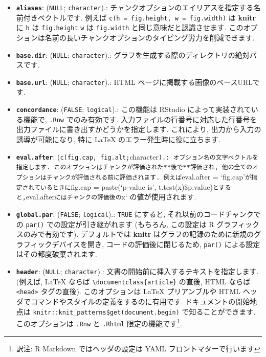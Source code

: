 \documentclass[
  11pt,
]{bxjsreport}
\providecommand{\tightlist}{%
  \setlength{\itemsep}{0pt}\setlength{\parskip}{0pt}}
\begin{document}
\begin{itemize}
\tightlist
\item
  \textbf{\texttt{aliases}}: (\texttt{NULL}; \texttt{character}).: チャンクオプションのエイリアスを指定する名前付きベクトルです. 例えば \texttt{c(h = \textquotesingle{}fig.height\textquotesingle{},\ w\ =\ \textquotesingle{}fig.width\textquotesingle{})} は \textbf{knitr} に \texttt{h} は \texttt{fig.height} \texttt{w} は \texttt{fig.width} と同じ意味だと認識させます. このオプションは名前の長いチャンクオプションのタイピング労力を削減できます.
\item
  \textbf{\texttt{base.dir}}: (\texttt{NULL}; \texttt{character}).: グラフを生成する際のディレクトリの絶対パスです.
\item
  \textbf{\texttt{base.url}}: (\texttt{NULL}; \texttt{character}).: HTML ページに掲載する画像のベースURLです.
\item
  \textbf{\texttt{concordance}}: (\texttt{FALSE}; \texttt{logical}).: この機能は RStudio によって実装されている機能で, \texttt{.Rnw} でのみ有効です. 入力ファイルの行番号に対応した行番号を出力ファイルに書き出すかどうかを指定します. これにより, 出力から入力の誘導が可能になり, 特に LaTeX のエラー発生時に役に立ちます.
\item
  \textbf{\texttt{eval.after}}: (\texttt{c(\textquotesingle{}fig.cap\textquotesingle{},\ \textquotesingle{}fig.alt\textquotesingle{};}character\texttt{).: オプション名の文字ベクトルを指定します. このオプションはチャンクが評価された**後で**評価され, 他の全てのオプションはチャンクが評価される前に評価されます. 例えば}eval.after = `fig.cap'\texttt{が指定されているときに}fig.cap = paste(`p-value is', t.test(x)\$p.value)\texttt{とすると,}eval.after\texttt{にはチャンクの評価後の}x` の値が使用されます.
\item
  \textbf{\texttt{global.par}}: (\texttt{FALSE}; \texttt{logical}).: \texttt{TRUE} にすると, それ以前のコードチャンクでの \texttt{par()} での設定が引き継がれます (もちろん, この設定は R グラフィックスのみで有効です). デフォルトでは \textbf{knitr} はグラフの記録のために新規のグラフィックデバイスを開き, コードの評価後に閉じるため, \texttt{par()} による設定はその都度破棄されます.
\item
  \textbf{\texttt{header}}: (\texttt{NULL}; \texttt{character}).: 文書の開始前に挿入するテキストを指定します. (例えば, LaTeX ならば \texttt{\textbackslash{}documentclass\{article\}} の直後, HTML ならば \texttt{\textless{}head\textgreater{}} タグの直後). このオプションは LaTeX プリアンブルや HTML ヘッダでコマンドやスタイルの定義をするのに有用です. ドキュメントの開始地点は \texttt{knitr::knit\_patterns\$get(\textquotesingle{}document.begin\textquotesingle{})} で知ることができます. このオプションは \texttt{.Rnw} と \texttt{.Rhtml} 限定の機能です\footnote{訳注: R Markdown ではヘッダの設定は YAML フロントマターで行います}.

\end{itemize}
\end{document}
